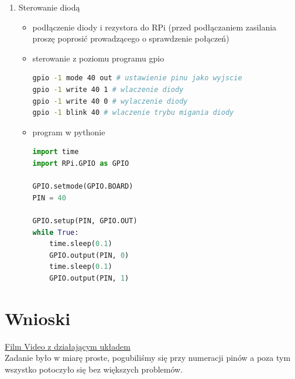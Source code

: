 \documentclass[a4paper,12pt]{extarticle}  %
\begin{document}
\begin{enumerate}
    \item Sterowanie diodą 
    \begin{itemize}
        \item podłączenie diody i rezystora do RPi (przed podłączaniem zasilania proszę poprosić prowadzącego o sprawdzenie połączeń)
        \begin{figure}[H]
           \centering
        \end{figure}
        \item sterowanie z poziomu programu gpio
        \begin{lstlisting}[language = Bash]
gpio -1 mode 40 out # ustawienie pinu jako wyjscie
gpio -1 write 40 1 # wlaczenie diody
gpio -1 write 40 0 # wylaczenie diody
gpio -1 blink 40 # wlaczenie trybu migania diody
\end{lstlisting}
        \item program w pythonie 
        \begin{lstlisting}[language = Python]
import time
import RPi.GPIO as GPIO

GPIO.setmode(GPIO.BOARD)
PIN = 40

GPIO.setup(PIN, GPIO.OUT)
while True:
    time.sleep(0.1)
    GPIO.output(PIN, 0)
    time.sleep(0.1)
    GPIO.output(PIN, 1)
        \end{lstlisting}
    \end{itemize}
\end{enumerate}

\section{Wnioski}
\href{https://s3.baraniecki.eu/rasp_led.webm}{Film Video z działającym układem}\\
Zadanie było w miarę proste, pogubiliśmy się przy numeracji pinów a poza tym wszystko potoczyło się bez większych problemów.
\end{document}
